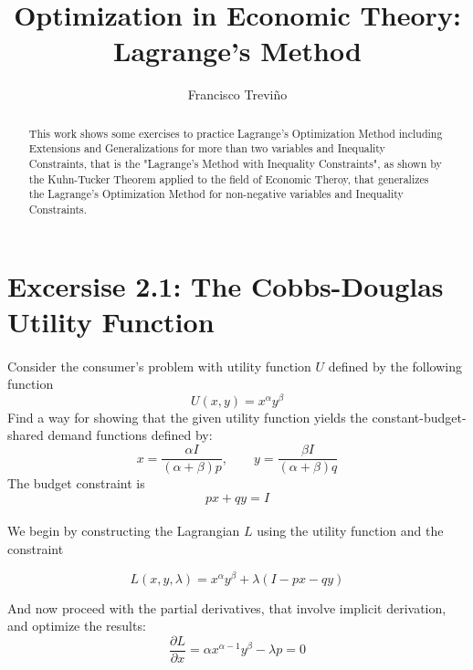 \documentclass{article}
\author{Francisco Treviño}
\title{Optimization in Economic Theory:\\Lagrange's Method}
\begin{document}
\maketitle

\medskip

\begin{abstract}
This work shows some exercises to practice Lagrange's Optimization Method including Extensions and Generalizations for more than two variables and Inequality Constraints, that is the "Lagrange's Method with Inequality Constraints", as shown by the Kuhn-Tucker Theorem applied to the field of Economic Theroy, that generalizes the Lagrange's Optimization Method for non-negative variables and Inequality Constraints.
\end{abstract}

\bigskip

\section*{Excersise 2.1: The Cobbs-Douglas Utility Function}
\paragraph{}
Consider the consumer's problem with utility function $U$ defined by the following function
  \begin{equation}
    U(x, y) = x^\alpha y^\beta
  \end{equation}
Find a way for showing that the given utility function yields the constant-budget-shared demand functions defined by:
  \begin{equation}\label{df}
    x = \frac{\alpha I}{(\alpha + \beta)p}, \qquad y = \frac{\beta I}{(\alpha + \beta)q}
  \end{equation}
The budget constraint is
  \begin{equation}
    px + qy = I
  \end{equation}

\paragraph{}
We begin by constructing the Lagrangian $L$ using the utility function and the constraint

  \begin{equation}
     L(x, y, \lambda) = x^\alpha y^\beta + \lambda (I - px - qy)
  \end{equation}

And now proceed with the partial derivatives, that involve implicit derivation, and optimize the results:
  \begin{equation}
    \frac{\partial L}{\partial x} = \alpha x^{\alpha - 1} y^\beta - \lambda p = 0
  \end{equation}
\end{document}
